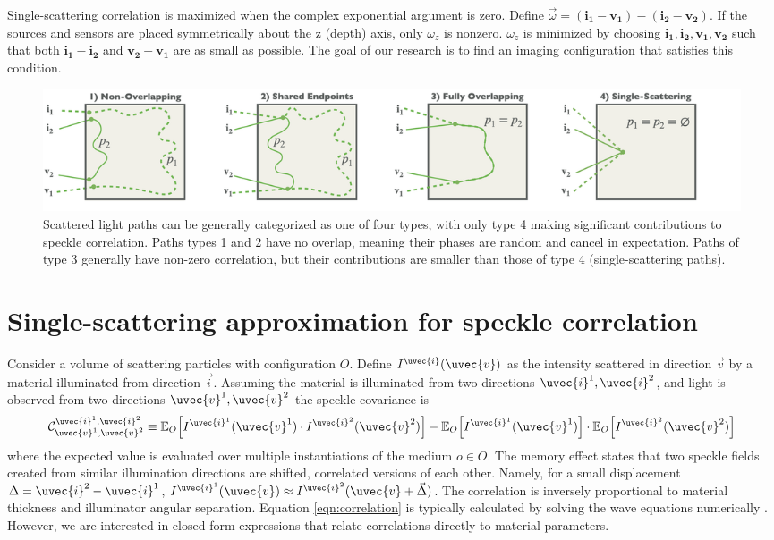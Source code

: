 Single-scattering correlation is maximized when the complex exponential argument is zero. Define $\vec{\omega} = (\mathbf{i_1} - \mathbf{v_1}) - (\mathbf{i_2} - \mathbf{v_2})$. If the sources and sensors are placed symmetrically about the z (depth) axis, only $\omega_z$ is nonzero. $\omega_z$ is minimized by choosing $\mathbf{i_1,i_2,v_1,v_2}$ such that both $\mathbf{i_1} - \mathbf{i_2}$ and $\mathbf{v_2} - \mathbf{v_1}$ are as small as possible. The goal of our research is to find an imaging configuration that satisfies this condition.
%
\begin{figure}
    \centering
    \includegraphics[width=\textwidth]{figures/path_types.png}
    \caption{Scattered light paths can be generally categorized as one of four types, with only type 4 making significant contributions to speckle correlation. Paths types 1 and 2 have no overlap, meaning their phases are random and cancel in expectation. Paths of type 3 generally have non-zero correlation, but their contributions are smaller than those of type 4 (single-scattering paths).}
    \label{fig:path_types}
\end{figure}

\section{Single-scattering approximation for speckle correlation}
Consider a volume of scattering particles with configuration $O$. Define $I^{\uvec{i}}(\uvec{v})$ as the intensity scattered in direction $\vec{v}$ by a material illuminated from direction $\vec{i}$. Assuming the material is illuminated from two directions $\uvec{i}^1, \uvec{i}^2$, and light is observed from two directions $\uvec{v}^1, \uvec{v}^2$ the speckle covariance is
%
\begin{equation}
    \mathcal{C}_{\uvec{v}^1,\uvec{v}^2}^{\uvec{i}^1,\uvec{i}^2} \equiv \mathbb{E}_O\Big[I^{\uvec{i}^1}(\uvec{v}^1) \cdot I^{\uvec{i}^2}(\uvec{v}^2)\Big] - \mathbb{E}_O\Big[I^{\uvec{i}^1}(\uvec{v}^1)\Big] \cdot \mathbb{E}_O\Big[I^{\uvec{i}^2}(\uvec{v}^2)\Big]
    \label{eqn:correlation}
\end{equation}
%
where the expected value is evaluated over multiple instantiations of the medium $o \in O$.
The memory effect states that two speckle fields created from similar illumination directions are shifted, correlated versions of each other. Namely, for a small displacement $\Delta = \uvec{i}^2 - \uvec{i}^1$, $I^{\uvec{i}^1}(\uvec{v}) \approx I^{\uvec{i}^2}(\uvec{v} + \vec{\Delta})$. The correlation is inversely proportional to material thickness and illuminator angular separation. Equation \ref{eqn:correlation} is typically calculated by solving the wave equations numerically \cite{thierry2015mu, treeby2010k, yee1966numerical}. However, we are interested in closed-form expressions that relate correlations directly to material parameters.

